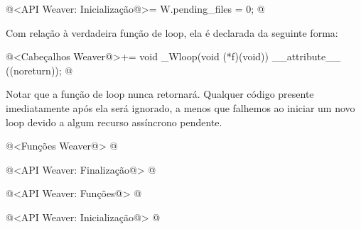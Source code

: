 \iniciocodigo
@<API Weaver: Inicialização@>=
W.pending_files = 0;
@
\fimcodigo

Com relação à verdadeira função de loop, ela é declarada da seguinte
forma:

\iniciocodigo
@<Cabeçalhos Weaver@>+=
void _Wloop(void (*f)(void)) __attribute__ ((noreturn));
@
\fimcodigo

Notar que a função de loop nunca retornará. Qualquer código presente
imediatamente após ela será ignorado, a menos que falhemos ao iniciar
um novo loop devido a algum recurso assíncrono pendente.






@<Funções Weaver@>
@

@<API Weaver: Finalização@>
@

@<API Weaver: Funções@>
@

@<API Weaver: Inicialização@>
@


\fim
